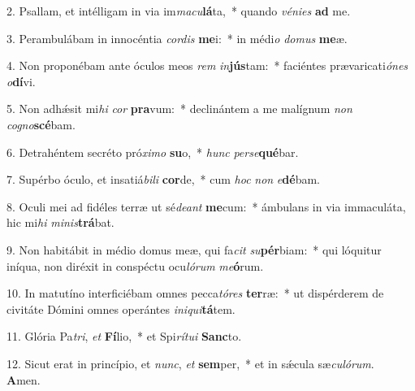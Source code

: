 2. Psallam, et intélligam in via im\textit{ma}\textit{cu}\textbf{lá}ta,~*  quando \textit{vé}\textit{ni}\textit{es} \textbf{ad} me.\

3. Perambulábam in innocéntia \textit{cor}\textit{dis} \textbf{me}i:~*  in médi\textit{o} \textit{do}\textit{mus} \textbf{me}æ.\

4. Non proponébam ante óculos meos \textit{rem} \textit{in}\textbf{jús}tam:~*  faciéntes prævaricati\textit{ó}\textit{nes} \textit{o}\textbf{dí}vi.\

5. Non adhǽsit mi\textit{hi} \textit{cor} \textbf{pra}vum:~*  declinántem a me malígnum \textit{non} \textit{co}\textit{gno}\textbf{scé}bam.\

6. Detrahéntem secréto pró\textit{xi}\textit{mo} \textbf{su}o,~*  \textit{hunc} \textit{per}\textit{se}\textbf{qué}bar.\

7. Supérbo óculo, et insatiá\textit{bi}\textit{li} \textbf{cor}de,~*  cum \textit{hoc} \textit{non} \textit{e}\textbf{dé}bam.\

8. Oculi mei ad fidéles terræ ut sé\textit{de}\textit{ant} \textbf{me}cum:~*  ámbulans in via immaculáta, hic mi\textit{hi} \textit{mi}\textit{nis}\textbf{trá}bat.\

9. Non habitábit in médio domus meæ, qui fa\textit{cit} \textit{su}\textbf{pér}biam:~*  qui lóquitur iníqua, non diréxit in conspéctu ocu\textit{ló}\textit{rum} \textit{me}\textbf{ó}rum.\

10. In matutíno interficiébam omnes pecca\textit{tó}\textit{res} \textbf{ter}ræ:~*  ut dispérderem de civitáte Dómini omnes operántes \textit{in}\textit{i}\textit{qui}\textbf{tá}tem.\

11. Glória Pa\textit{tri}, \textit{et} \textbf{Fí}lio,~*  et Spi\textit{rí}\textit{tu}\textit{i} \textbf{Sanc}to.\

12. Sicut erat in princípio, et \textit{nunc}, \textit{et} \textbf{sem}per,~*  et in sǽcula sæ\textit{cu}\textit{ló}\textit{rum}. \textbf{A}men.\

